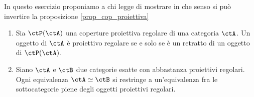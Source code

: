 \begin{exercise}\label{ex_cop_proiettiva}
 In questo esercizio proponiamo a chi legge di mostrare in che senso si può invertire la proposizione \ref{prop_cop_proiettiva}
 \begin{enumerate}
  \item Sia \(\ctP(\ctA)\) una coperture proiettiva regolare di una categoria \(\ctA\). Un oggetto di \(\ctA\) è proiettivo regolare
        se e solo se è un retratto di un oggetto di \(\ctP(\ctA)\).
  \item Siano \(\ctA\) e \(\ctB\) due categorie esatte con abbastanza proiettivi regolari. Ogni equivalenza \(\ctA \simeq \ctB\)
        si restringe a un'equivalenza fra le sottocategorie piene degli oggetti proiettivi regolari.
 \end{enumerate}
\end{exercise}

\color{black}